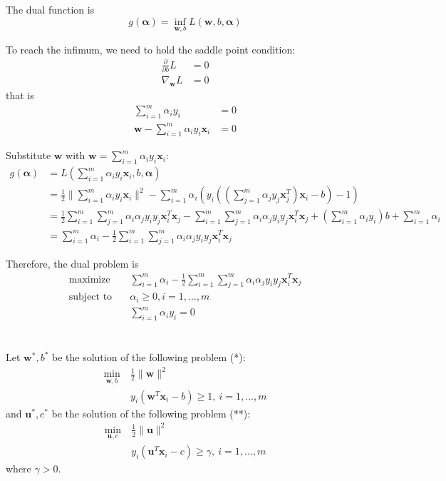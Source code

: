 \documentclass{article}[11pt]
\begin{document}
The dual function is
\[ g(\boldsymbol{\alpha}) = \inf_{\mathbf{w}, b} L(\mathbf{w}, b, \boldsymbol{\alpha}) \]

To reach the infimum, we need to hold the saddle point condition:
\begin{align*}
  \frac{\partial}{\partial b}L &= 0 \\
  \nabla_{\mathbf{w}} L &= 0
\end{align*}
that is
\begin{align*}
   \sum_{i=1}^{m} \alpha_i y_i &= 0 \\
   \mathbf{w} - \sum_{i=1}^{m} \alpha_i y_i \mathbf{x}_i &= 0
\end{align*}

Substitute $\mathbf{w}$ with $\mathbf{w} = \sum_{i=1}^{m} \alpha_i y_i \mathbf{x}_i$:
\begin{align*}
  g(\boldsymbol{\alpha}) &= L(\sum_{i=1}^{m} \alpha_i y_i \mathbf{x}_i, b, \boldsymbol{\alpha}) \\
  &= \frac{1}{2} \lVert \sum_{i=1}^{m} \alpha_i y_i \mathbf{x}_i \rVert^2 - \sum_{i=1}^{m} \alpha_i (y_i ( (\sum_{j=1}^{m} \alpha_j y_j \mathbf{x}_j^T) \mathbf{x}_i - b) - 1) \\
  &= \frac{1}{2} \sum_{i=1}^{m} \sum_{j=1}^{m} \alpha_i \alpha_j y_i y_j \mathbf{x}_i^T \mathbf{x}_j - \sum_{i=1}^{m} \sum_{j=1}^{m} \alpha_i \alpha_j y_i y_j \mathbf{x}_i^T \mathbf{x}_j + (\sum_{i=1}^{m} \alpha_i y_i) b + \sum_{i=1}^{m} \alpha_i \\
  &= \sum_{i=1}^{m} \alpha_i - \frac{1}{2} \sum_{i=1}^{m} \sum_{j=1}^{m} \alpha_i \alpha_j y_i y_j \mathbf{x}_i^T \mathbf{x}_j
\end{align*}

Therefore, the dual problem is
\begin{align*}
  \text{maximize} \quad & \sum_{i=1}^{m} \alpha_i - \frac{1}{2} \sum_{i=1}^{m} \sum_{j=1}^{m} \alpha_i \alpha_j y_i y_j \mathbf{x}_i^T \mathbf{x}_j \\
    \text{subject to} \quad & \alpha_i \ge 0, i = 1, \dots, m \\ 
  & \sum_{i=1}^{m} \alpha_i y_i = 0
\end{align*}
\section{}
Let $\mathbf{w}^*, b^*$ be the solution of the following problem (*):
\begin{align*}
  \min_{\mathbf{w}, b} ~& \frac{1}{2} \lVert \mathbf{w} \rVert^2 \\
  & y_i(\mathbf{w}^T \mathbf{x}_i - b) \ge 1,~ i = 1, \dots, m
\end{align*}
and $\mathbf{u}^*, c^*$ be the solution of the following problem (**):
\begin{align*}
  \min_{\mathbf{u}, c} ~& \frac{1}{2} \lVert \mathbf{u} \rVert^2 \\
  & y_i(\mathbf{u}^T \mathbf{x}_i - c) \ge \gamma,~ i = 1, \dots, m
\end{align*}
where $\gamma > 0$.
\end{document}
